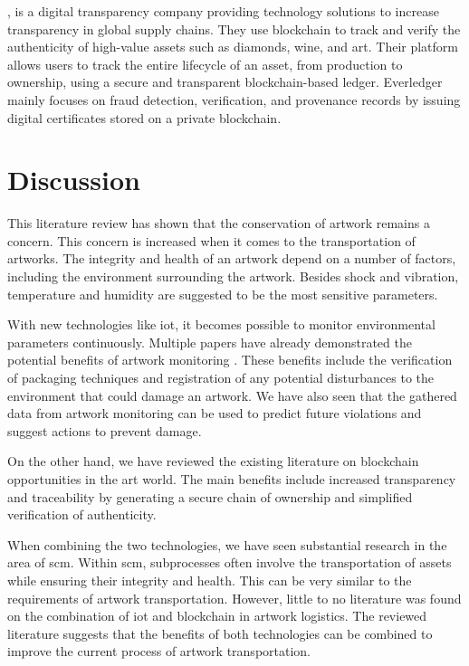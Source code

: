 \textcite{everledger}, is a digital transparency company providing technology solutions to increase transparency in global supply chains. They use blockchain to track and verify the authenticity of high-value assets such as diamonds, wine, and art. Their platform allows users to track the entire lifecycle of an asset, from production to ownership, using a secure and transparent blockchain-based ledger. Everledger mainly focuses on fraud detection, verification, and provenance records by issuing digital certificates stored on a private blockchain.

\section{Discussion}
\label{sec:related_work_discussion}
This literature review has shown that the conservation of artwork remains a concern. This concern is increased when it comes to the transportation of artworks. The integrity and health of an artwork depend on a number of factors, including the environment surrounding the artwork. Besides shock and vibration, temperature and humidity are suggested to be the most sensitive parameters.

With new technologies like \gls{iot}, it becomes possible to monitor environmental parameters continuously. Multiple papers have already demonstrated the potential benefits of artwork monitoring \cite{pactart} \cite{riskmonitoring} \cite{woodenartworkmonitoring} \cite{shockvibrationtransit}. These benefits include the verification of packaging techniques and registration of any potential disturbances to the environment that could damage an artwork. We have also seen that the gathered data from artwork monitoring can be used to predict future violations and suggest actions to prevent damage.

On the other hand, we have reviewed the existing literature on blockchain opportunities in the art world. The main benefits include increased transparency and traceability by generating a secure chain of ownership and simplified verification of authenticity.

When combining the two technologies, we have seen substantial research in the area of \gls{scm}. Within \gls{scm}, subprocesses often involve the transportation of assets while ensuring their integrity and health. This can be very similar to the requirements of artwork transportation. However, little to no literature was found on the combination of \gls{iot} and blockchain in artwork logistics. The reviewed literature suggests that the benefits of both technologies can be combined to improve the current process of artwork transportation.
